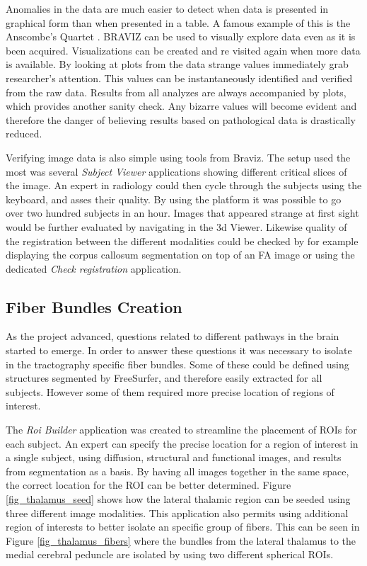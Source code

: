 Anomalies in the data are much easier to detect when data is presented in graphical form than when presented in a table. A famous example of this is the Anscombe's Quartet \autocite{anscombe_graphs_1973}. BRAVIZ can be used to visually explore data even as it is been acquired. Visualizations can be created and re visited again when more data is available. By looking at plots from the data strange values immediately grab researcher's attention. This values can be instantaneously identified and verified from the raw data. Results from all analyzes are always accompanied by plots, which provides another sanity check. Any bizarre values will become evident and therefore the danger of believing results based on pathological data is drastically reduced.

Verifying image data is also simple using tools from Braviz. The setup used the most was several \emph{Subject Viewer} applications showing different critical slices of the image. An expert in radiology could then cycle through the subjects using the keyboard, and asses their quality. By using the platform it was possible to go over two hundred subjects in an hour. Images that appeared strange at first sight would be further evaluated by navigating in the 3d Viewer. Likewise quality of the registration between the different modalities could be checked by for example displaying the corpus callosum segmentation on top of an FA image or using the dedicated \emph{Check registration} application. 

\subsection{Fiber Bundles Creation}

As the project advanced, questions related to different pathways in the brain started to emerge. In order to answer these questions it was necessary to isolate in the tractography specific fiber bundles. Some of these could be defined using structures segmented by FreeSurfer, and therefore easily extracted for all subjects. However some of them required more precise location of regions of interest. 

The \emph{Roi Builder} application was created to streamline the placement of ROIs for each subject. An expert can specify the precise location for a region of interest in a single subject, using diffusion, structural and functional images, and results from segmentation as a basis. By having all images together in the same space, the correct location for the ROI can be better determined. Figure \ref{fig_thalamus_seed} shows how the lateral thalamic region can be seeded using three different image modalities.  This application also permits using additional region of interests to better isolate an specific group of fibers. This can be seen in Figure \ref{fig_thalamus_fibers} where the bundles from the lateral thalamus to the medial cerebral peduncle are isolated by using two different spherical ROIs. 

